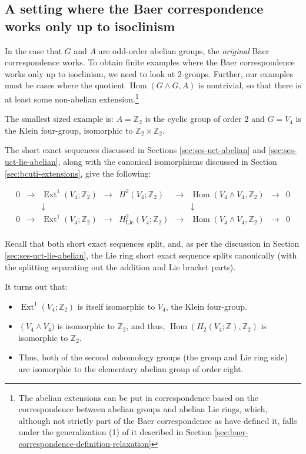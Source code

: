 \documentclass[10pt]{amsart}
\begin{document}
\subsection{A setting where the Baer correspondence works only up to isoclinism}\label{sec:bcuti-ex}

In the case that $G$ and $A$ are odd-order abelian groups, the {\em
  original} Baer correspondence works. To obtain finite examples where
the Baer correspondence works only up to isoclinism, we need to look
at $2$-groups. Further, our examples must be cases where the quotient
$\operatorname{Hom}(G \wedge G,A)$ is nontrivial, so that there is at
least some non-abelian extension.\footnote{The abelian extensions can
  be put in correspondence based on the correspondence between abelian
  groups and abelian Lie rings, which, although not strictly part of
  the Baer correspondence as have defined it, falls under the
  generalization (1) of it described in Section
  \ref{sec:baer-correspondence-definition-relaxation}}

The smallest sized example is: $A = \mathbb{Z}_2$ is the cyclic group
of order $2$ and $G = V_4$ is the Klein four-group, isomorphic to
$\mathbb{Z}_2 \times \mathbb{Z}_2$.

The short exact sequences discussed in Sections
\ref{sec:ses-uct-abelian} and \ref{sec:ses-uct-lie-abelian}, along
with the canonical isomorphisms discussed in Section
\ref{sec:bcuti-extensions}, give the following:

$$\begin{array}{ccccccccc}
0 & \to & \operatorname{Ext}^1(V_4;\mathbb{Z}_2) & \to & H^2(V_4;\mathbb{Z}_2) & \to & \operatorname{Hom}(V_4 \wedge V_4,\mathbb{Z}_2) & \to & 0 \\
& & \downarrow & & & & \downarrow & & \\
0 & \to & \operatorname{Ext}^1(V_4;\mathbb{Z}_2) & \to & H^2_{\text{Lie}}(V_4;\mathbb{Z}_2) & \to & \operatorname{Hom}(V_4 \wedge V_4,\mathbb{Z}_2) & \to & 0\\
\end{array}$$

Recall that both short exact sequences split, and, as per the
discussion in Section \ref{sec:ses-uct-lie-abelian}, the Lie ring
short exact sequence splits canonically (with the splitting separating
out the addition and Lie bracket parts).

It turns out that:

\begin{itemize}
\item $\operatorname{Ext}^1(V_4;\mathbb{Z}_2)$ is itself isomorphic to $V_4$, the Klein four-group.
\item $\operatorname(V_4 \wedge V_4)$ is isomorphic to $\mathbb{Z}_2$,
  and thus, $\operatorname{Hom}(H_2(V_4;\mathbb{Z}),\mathbb{Z}_2)$ is
  isomorphic to $\mathbb{Z}_2$.
\item Thus, both of the second cohomology groups (the group and Lie
  ring side) are isomorphic to the elementary abelian group of order
  eight.
\end{itemize}
\end{document}
